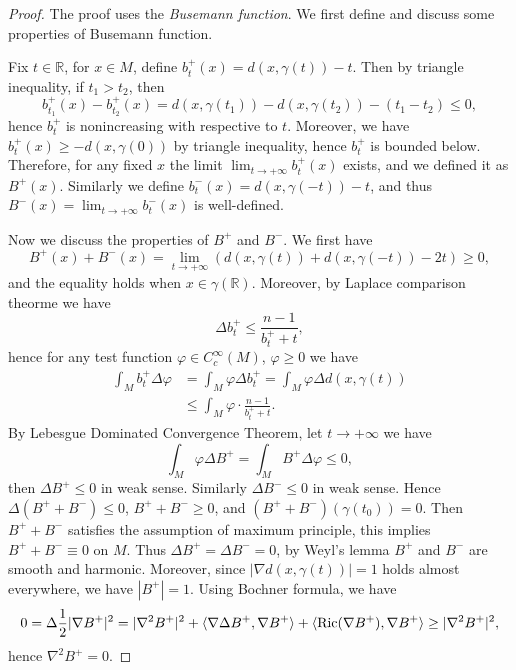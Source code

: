 \begin{proof}
    The proof uses the \emph{Busemann function}.
    We first define and discuss some properties of Busemann function.

    Fix $t\in\mathbb{R}$, for $x\in M$, define $b^+_t(x)=d(x,\gamma(t))-t$.
    Then by triangle inequality, if $t_1>t_2$, then
    \[b_{t_1}^+(x)-b_{t_2}^+(x)=d(x,\gamma(t_1))-d(x,\gamma(t_2))-(t_1-t_2)\leq 0,\]
    hence $b_t^+$ is nonincreasing with respective to $t$.
    Moreover, we have $b_t^+(x)\geq-d(x,\gamma(0))$ by triangle inequality, hence $b_t^+$ is bounded below.
    Therefore, for any fixed $x$ the limit $\lim_{t\to+\infty}b^+_t(x)$ exists, and we defined it as $B^+(x)$.
    Similarly we define $b^-_t(x)=d(x,\gamma(-t))-t$, and thus $B^-(x)=\lim_{t\to+\infty}b^-_t(x)$ is well-defined.

    Now we discuss the properties of $B^+$ and $B^-$.
    We first have
    \[B^+(x)+B^-(x)=\lim_{t\to+\infty}(d(x,\gamma(t))+d(x,\gamma(-t))-2t)\geq 0,\]
    and the equality holds when $x\in\gamma(\mathbb{R})$.
    Moreover, by Laplace comparison theorme we have
    \[\Delta b^+_t\leq\frac{n-1}{b^+_t+t},\]
    hence for any test function $\varphi\in C^\infty_c(M)$, $\varphi\geq 0$ we have
    \begin{align*}
        \int_Mb^+_t\Delta\varphi&=\int_M\varphi\Delta b^+_t=\int_M\varphi\Delta d(x,\gamma(t))\\
        &\leq\int_M\varphi\cdot\frac{n-1}{b^+_t+t}.
    \end{align*}
    By Lebesgue Dominated Convergence Theorem, let $t\to+\infty$ we have
    \[\int_M\varphi\Delta B^+=\int_M B^+\Delta\varphi\leq 0,\]
    then $\Delta B^+\leq 0$ in weak sense.
    Similarly $\Delta B^-\leq 0$ in weak sense.
    Hence $\Delta(B^++B^-)\leq 0$, $B^++B^-\geq 0$, and $(B^++B^-)(\gamma(t_0))=0$.
    Then $B^++B^-$ satisfies the assumption of maximum principle, this implies $B^++B^-\equiv 0$ on $M$.
    Thus $\Delta B^+=\Delta B^-=0$, by Weyl's lemma $B^+$ and $B^-$ are smooth and harmonic.
    Moreover, since $|\nabla d(x,\gamma(t))|=1$ holds almost everywhere, we have $|B^+|=1$.
    Using Bochner formula, we have
    \[0=\Delta\frac{1}{2}|\nabla B^+|^2=|\nabla^2B^+|^2+\langle\nabla\Delta B^+,\nabla B^+\rangle+\langle\operatorname{Ric}(\nabla B^+),\nabla B^+\rangle\geq|\nabla^2B^+|^2,\]
    hence $\nabla^2B^+=0$.


\end{proof}
